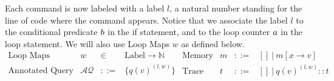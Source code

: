 Each command is now labeled with a label $l$, a natural number standing for the line of code where the command appears. Notice that we associate the label $l$ to the conditional predicate $b$ in the if statement, and to the loop counter $a$ in the loop statement. We will also use  Loop Maps $w$ as defined below.  
\[
\begin{array}{llll}
 \mbox{Loop Maps} & w & \in & \mbox{Label} \to \mathbb{N} \\
%
\mbox{Annotated Query} & \mathcal{AQ}  & ::= & \{ q(v)^{(l,w)}  \} \\
\end{array}
\begin{array}{llll}
    \mbox{Memory} & m & ::= & [] ~|~ m[x \to v] \\
\mbox{Trace} & t & ::= & [] ~|~ q(v)^{(l, w) } :: t \\
\end{array}
\]


